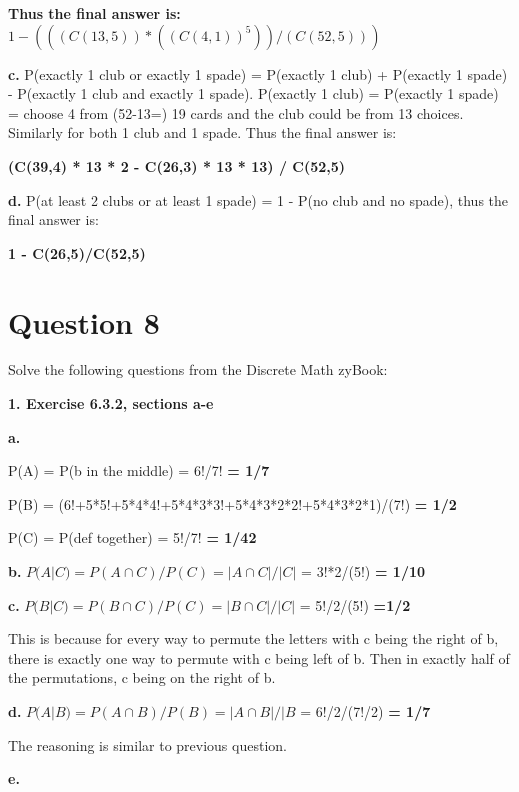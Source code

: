 \documentclass[11pt]{article}
\begin{document}
	\textbf{Thus the final answer is:}
	$1-(((C(13,5))*((C(4,1))^5))/(C(52,5)))$
	
	\vspace{10mm}
	\textbf{c.}
	P(exactly 1 club or exactly 1 spade) = P(exactly 1 club) + P(exactly 1 spade) - P(exactly 1 club and exactly 1 spade). P(exactly 1 club) = P(exactly 1 spade) = choose 4 from (52-13=) 19 cards and the club could be from 13 choices. Similarly for both 1 club and 1 spade. Thus the final answer is:
	
	\textbf{(C(39,4) * 13 * 2 - C(26,3) * 13 * 13) / C(52,5)}

	
	\vspace{10mm}
	\textbf{d.}
	P(at least 2 clubs or at least 1 spade) = 1 - P(no club and no spade), thus the final answer is:
	
	\textbf{1 - C(26,5)/C(52,5)}
	
	\newpage
	\section*{Question 8}
	Solve the following questions from the Discrete Math zyBook:
	
	\textbf{1. Exercise 6.3.2, sections a-e}
	
	\textbf{a.}
	
	P(A) = P(b in the middle) = 6!/7! \textbf{= 1/7}
	
	P(B) = (6!+5*5!+5*4*4!+5*4*3*3!+5*4*3*2*2!+5*4*3*2*1)/(7!) \textbf{= 1/2}
	
	P(C) = P(def together) = 5!/7! \textbf{= 1/42}
	
	\vspace{10mm}
	\textbf{b.}
	$P(A|C)=P(A\cap C)/P(C)=|A\cap C|/|C|$ = 3!*2/(5!) \textbf{= 1/10}

	
	\vspace{10mm}
	\textbf{c.}
	$P(B|C)=P(B\cap C)/P(C)=|B\cap C|/|C|$ = 5!/2/(5!) \textbf{=1/2}
	
	This is because for every way to permute the letters with c being the right of b, there is exactly one way to permute with c being left of b. Then in exactly  half of the permutations, c being on the right of b.
	
	
	\vspace{10mm}
	\textbf{d.}
	$P(A|B)=P(A\cap B)/P(B)=|A\cap B|/|B$ = 6!/2/(7!/2) \textbf{= 1/7}

	The reasoning is similar to previous question.
	
	\vspace{10mm}
	\textbf{e.}
	
\end{document}

